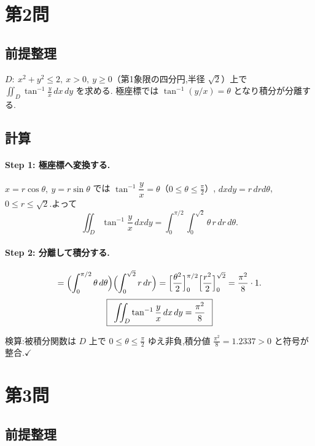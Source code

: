 \documentclass[11pt,a4paper]{article}
\begin{document}
\section*{第2問}

\subsection*{前提整理}

$D:\ x^2+y^2\le2,\ x>0,\ y\ge0$（第1象限の四分円,半径 $\sqrt2$）上で
$\displaystyle\iint_D\tan^{-1}\frac{y}{x}\,dx\,dy$ を求める.
極座標では $\tan^{-1}(y/x)=\theta$ となり積分が分離する.

\subsection*{計算}

\paragraph{Step 1: 極座標へ変換する.}
$x=r\cos\theta,\ y=r\sin\theta$ では $\tan^{-1}\dfrac{y}{x}=\theta$（$0\le\theta\le\frac\pi2$）,
$dxdy=r\,drd\theta$,$0\le r\le\sqrt2$.よって
\[
\iint_D\tan^{-1}\frac{y}{x}\,dxdy
=\int_0^{\pi/2}\!\!\int_0^{\sqrt2}\theta\,r\,dr\,d\theta.
\]

\paragraph{Step 2: 分離して積分する.}
\[
=\Bigl(\int_0^{\pi/2}\theta\,d\theta\Bigr)\Bigl(\int_0^{\sqrt2}r\,dr\Bigr)
=\Bigl[\frac{\theta^2}{2}\Bigr]_0^{\pi/2}\Bigl[\frac{r^2}{2}\Bigr]_0^{\sqrt2}
=\frac{\pi^2}{8}\cdot1.
\]
\[
\ans{\ \iint_D\tan^{-1}\frac{y}{x}\,dx\,dy=\frac{\pi^2}{8}\ }
\]

検算:被積分関数は $D$ 上で $0\le\theta\le\frac\pi2$ ゆえ非負,積分値 $\frac{\pi^2}{8}=1.2337>0$
と符号が整合.$\checkmark$

\section*{第3問}

\subsection*{前提整理}
\end{document}
